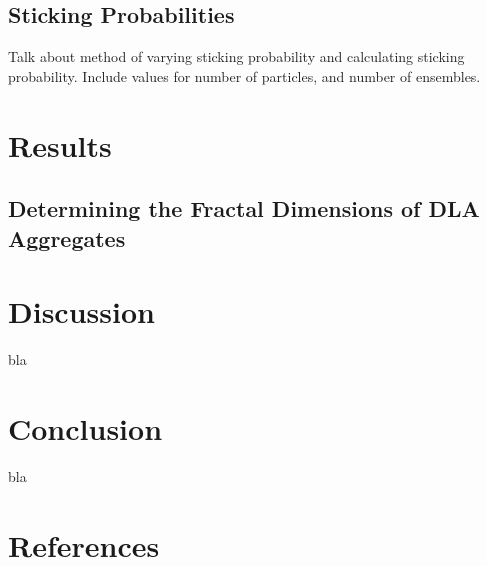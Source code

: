 \documentclass[11pt]{iopart}
\begin{document}
\subsection{Sticking Probabilities}

Talk about method of varying sticking probability and calculating sticking probability. Include values for number of particles, and number of ensembles.

\section{Results}

\subsection{Determining the Fractal Dimensions of DLA Aggregates}



\section{Discussion}
bla

\section{Conclusion}
bla

\section*{References}


\end{document}
